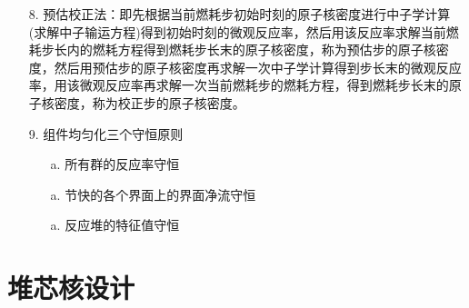 \documentclass[openany]{ctexart}
\numberwithin{equation}{section} %
\begin{document}
\begin{itemize}
	\vspace{0.12cm}
	
	\item [8.]预估校正法：即先根据当前燃耗步初始时刻的原子核密度进行中子学计算 (求解中子输运方程)得到初始时刻的微观反应率，然后用该反应率求解当前燃耗步长内的燃耗方程得到燃耗步长末的原子核密度，称为预估步的原子核密度，然后用预估步的原子核密度再求解一次中子学计算得到步长末的微观反应率，用该微观反应率再求解一次当前燃耗步的燃耗方程，得到燃耗步长末的原子核密度，称为校正步的原子核密度。
	
	\vspace{0.1cm}
	
	\item [9.] 组件均匀化三个守恒原则
		\begin{itemize}
			\item [a.]所有群的反应率守恒
			\vspace{-0.08cm}
			\item [a.]节快的各个界面上的界面净流守恒
			\vspace{-0.08cm}
			\item [a.]反应堆的特征值守恒
			\vspace{-0.08cm}
		\end{itemize}
	
\end{itemize}


\section{堆芯核设计}
\end{document}
